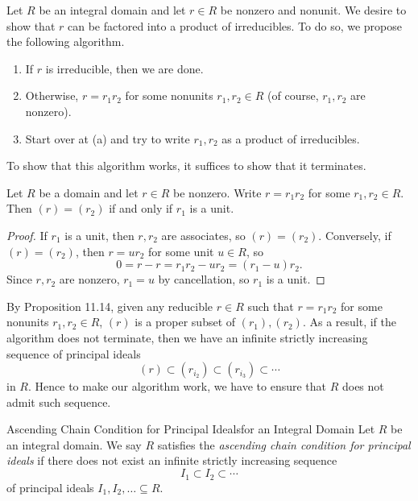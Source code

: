 \documentclass[pmath347]{subfiles}
\begin{document}
    Let $R$ be an integral domain and let $r\in R$ be nonzero and nonunit. We desire to show that $r$ can be factored into a product of irreducibles. To do so, we propose the following algorithm.
    \begin{enumerate}
        \item If $r$ is irreducible, then we are done.
        \item Otherwise, $r=r_1r_2$ for some nonunits $r_1,r_2\in R$ (of course, $r_1,r_2$ are nonzero).
        \item Start over at (a) and try to write $r_1,r_2$ as a product of irreducibles.
    \end{enumerate}
    To show that this algorithm works, it suffices to show that it terminates.

    \begin{prop}{}
        Let $R$ be a domain and let $r\in R$ be nonzero. Write $r=r_1r_2$ for some $r_1,r_2\in R$. Then $\left( r \right) = \left( r_2 \right)$ if and only if $r_1$ is a unit.
    \end{prop}

    \begin{proof}
        If $r_1$ is a unit, then $r,r_2$ are associates, so $\left( r \right) = \left( r_2 \right)$. Conversely, if $\left( r \right) = \left( r_2 \right)$, then $r=ur_2$ for some unit $u\in R$, so
        \begin{equation*}
            0 = r-r = r_1r_2-ur_2 = \left( r_1-u \right) r_2.
        \end{equation*}
        Since $r,r_2$ are nonzero, $r_1=u$ by cancellation, so $r_1$ is a unit.
    \end{proof}

    \noindent By Proposition 11.14, given any reducible $r\in R$ such that $r=r_1r_2$ for some nonunits $r_1,r_2\in R$, $\left( r \right)$ is a proper subset of $\left( r_1 \right) , \left( r_2 \right)$. As a result, if the algorithm does not terminate, then we have an infinite strictly increasing sequence of principal ideals
    \begin{equation*}
        \left( r \right) \subset \left( r_{i_2} \right) \subset \left( r_{i_3} \right) \subset \cdots
    \end{equation*}
    in $R$. Hence to make our algorithm work, we have to ensure that $R$ does not admit such sequence.

    \begin{definition}{Ascending Chain Condition for Principal Ideals}{for an Integral Domain}
        Let $R$ be an integral domain. We say $R$ satisfies the \emph{ascending chain condition for principal ideals} if there does not exist an infinite strictly increasing sequence
        \begin{equation*}
            I_1\subset I_2\subset \cdots
        \end{equation*}
        of principal ideals $I_1,I_2,\ldots\subseteq R$.
    \end{definition}
\end{document}
